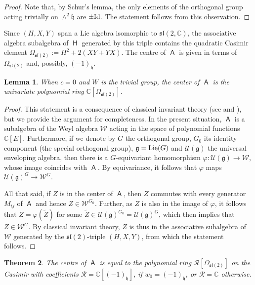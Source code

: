 \documentclass[10pt,a4paper]{amsart}
\numberwithin{equation}{section}
\newtheorem{Theorem}{Theorem}[section]
\newtheorem{Lemma}[Theorem]{Lemma}
\newcommand{\fg}{\mathfrak{g}}
\newcommand{\fh}{\mathfrak{h}}
\newcommand{\fl}{\mathfrak{l}}
\newcommand{\fs}{\mathfrak{s}}
\newcommand{\bbc}{\mathbb{C}}
\newcommand{\Cu}{\mathcal{U}}
\newcommand{\Cw}{\mathcal{W}}
\DeclareMathOperator{\rca}{\mathsf{H}}
\DeclareMathOperator{\ama}{\mathsf{A}}
\begin{document}
\begin{proof} Note that, by Schur's lemma, the only elements of the orthogonal group acting trivially on
$\wedge^2\mathfrak{h}$ are $\pm {\rm Id}$. The statement follows from this observation.
\end{proof}

Since $(H,X,Y)$ span a Lie algebra isomorphic to $\fs\fl(2,\bbc)$, the associative algebra subalgebra of $\rca$ generated by this triple contains the quadratic Casimir element $\Omega_{\fs\fl(2)} := H^2 +2(XY+YX)$. The centre of $\ama$ is given in terms of $\Omega_{\fs\fl(2)}$ and, possibly, $(-1)_\fh$.

\begin{Lemma}
When $c=0$ and $W$ is the trivial group, the center of $\ama$ is the univariate polynomial ring $\bbc[\Omega_{\fs\fl(2)}]$.
\end{Lemma}

\begin{proof}
This statement is a consequence of classical invariant theory (see \cite{H89} and \cite{W46}), but we provide the argument for completeness. In the present situation, $\ama$ is a subalgebra of the Weyl algebra $\Cw$ acting in the space of polynomial functions $\bbc[E]$. Furthermore, if we denote by $G$ the orthogonal group, $G_0$ its identity component (the special orthogonal group), $\fg=\textup{Lie}(G)$ and $\Cu(\fg)$ the universal enveloping algebra, then there is a $G$-equivariant homomorphism $\varphi\colon \Cu(\fg)\to \Cw$, whose image coincides with $\ama$. By equivariance, it follows that $\varphi$ maps $\Cu(\fg)^G\to\Cw^G$.

All that said,
if $Z$ is in the center of $\ama$, then $Z$ commutes with every generator $M_{ij}$ of $\ama$ and hence $Z\in \Cw^{G_0}$. Further, as $Z$ is also in the image of $\varphi$, it follows that $Z = \varphi(\tilde{Z})$ for some $\tilde{Z} \in \Cu(\fg)^{G_0} = \Cu(\fg)^{G}$, which then implies that $Z\in \Cw^G$. By classical invariant theory, $Z$ is thus in the associative subalgebra of $\Cw$ generated by the $\fs\fl(2)$-triple $(H,X,Y)$, from which the statement follows.
\end{proof}

\begin{Theorem}
The centre of $\ama$ is equal to the polynomial ring $\mathcal{R}[\Omega_{\fs\fl(2)}]$ on the Casimir with coefficients $\mathcal{R}= \mathbb{C}[(-1)_\fh]$, if $w_0=(-1)_\fh$, or $\mathcal{R}=\mathbb{C}$ otherwise.
\end{Theorem}
\end{document}
